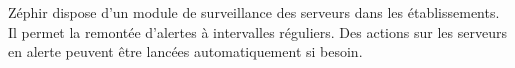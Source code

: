 Zéphir dispose d'un module de surveillance des serveurs dans les 
établissements. Il permet la remontée d'alertes à intervalles réguliers. 
Des actions sur les serveurs en alerte peuvent être lancées automatiquement 
si besoin.


